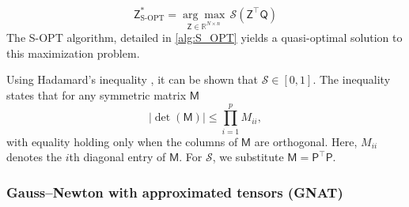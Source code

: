 \documentclass[11pt]{article}
\newcommand{\mat}[1]{\mathsf{#1}}
\begin{document}
\begin{equation}
\mat{Z}^*_{\text{S-OPT}} = \underset{\mat{Z}  \in \mathbb{R}^{N \times n}}{\arg\max} \, \mathscr{S}(\mat{Z}^\top \mat{Q})
\label{eq:sopt_max}
\end{equation}
The S-OPT algorithm,  detailed in \cref{alg:S_OPT} yields a quasi-optimal solution to this maximization problem.


Using Hadamard's inequality \cite{hadamard1893}, it can be shown that $\mathscr{S} \in [0,1]$.
The inequality states that for any symmetric matrix $\mat{M}$
\begin{equation} 
|\det(\mat{M})| \leq \prod_{i=1}^{p} M_{ii}, 
\end{equation}
with equality holding only when the columns of $\mat{M}$ are orthogonal.
Here, $M_{ii}$ denotes the $i$th diagonal entry of $\mat{M}$.
For $\mathscr{S}$, we substitute $\mat{M}=\mat{P}^\top\mat{P}$.





\subsubsection{Gauss–Newton with approximated tensors (GNAT)}
\end{document}
